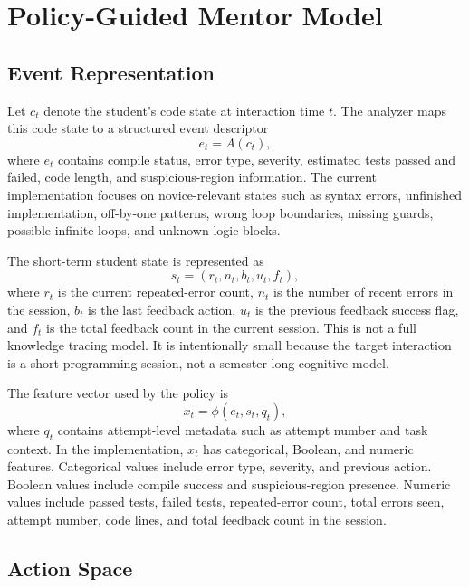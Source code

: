 \documentclass[twoside, 11pt]{article}
\begin{document}
\section{\large Policy-Guided Mentor Model}

\subsection{Event Representation}

Let $c_t$ denote the student's code state at interaction time $t$. The analyzer maps this code state to a structured event descriptor
\begin{equation}
e_t = A(c_t),
\end{equation}
where $e_t$ contains compile status, error type, severity, estimated tests passed and failed, code length, and suspicious-region information. The current implementation focuses on novice-relevant states such as syntax errors, unfinished implementation, off-by-one patterns, wrong loop boundaries, missing guards, possible infinite loops, and unknown logic blocks.

The short-term student state is represented as
\begin{equation}
s_t = (r_t, n_t, b_t, u_t, f_t),
\end{equation}
where $r_t$ is the current repeated-error count, $n_t$ is the number of recent errors in the session, $b_t$ is the last feedback action, $u_t$ is the previous feedback success flag, and $f_t$ is the total feedback count in the current session. This is not a full knowledge tracing model. It is intentionally small because the target interaction is a short programming session, not a semester-long cognitive model.

The feature vector used by the policy is
\begin{equation}
x_t = \phi(e_t, s_t, q_t),
\end{equation}
where $q_t$ contains attempt-level metadata such as attempt number and task context. In the implementation, $x_t$ has categorical, Boolean, and numeric features. Categorical values include error type, severity, and previous action. Boolean values include compile success and suspicious-region presence. Numeric values include passed tests, failed tests, repeated-error count, total errors seen, attempt number, code lines, and total feedback count in the session.

\subsection{Action Space}
\end{document}

